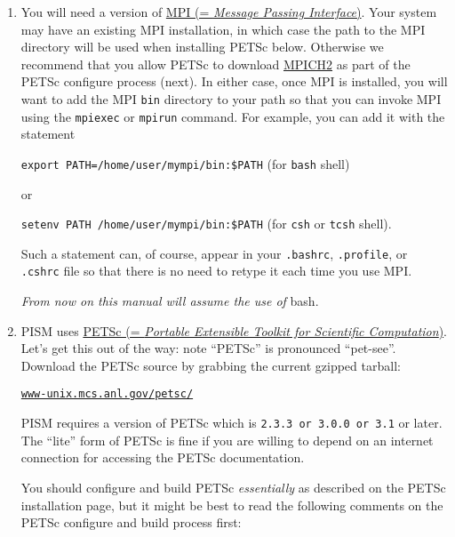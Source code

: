 \documentclass[11pt,final]{amsart}
\newcommand{\PETSCREL}{2.3.3 or 3.0.0 or 3.1}
\renewcommand{\t}[1]{\texttt{#1}}
\begin{document}
\begin{enumerate}
\item You will need a version of \href{http://www-unix.mcs.anl.gov/mpi/}{MPI (= \emph{Message Passing Interface})}. Your system may have an existing MPI installation, in which case the path to the MPI
  directory will be used when installing PETSc below. Otherwise we recommend that you allow PETSc to download
  \href{http://www-unix.mcs.anl.gov/mpi/mpich2/}{MPICH2} as part of the PETSc configure process (next). In either case, once MPI
  is installed, you will want to add the MPI \texttt{bin} directory to your path so that you can invoke MPI using the \texttt{mpiexec}
  or \texttt{mpirun} command. For example, you can add it with the statement

\texttt{export PATH=/home/user/mympi/bin:\$PATH}  \qquad (for \texttt{bash} shell)

\noindent or

\texttt{setenv PATH /home/user/mympi/bin:\$PATH}  \qquad (for \texttt{csh} or \texttt{tcsh} shell).

\noindent Such a statement can, of course, appear in your \texttt{.bashrc}, \texttt{.profile}, or \texttt{.cshrc} file so that there is
no need to retype it each time you use MPI.

\medskip
\begin{center}
  \emph{From now on this manual will assume the use of} bash.
\end{center}
\medskip

\item PISM uses \href{http://www-unix.mcs.anl.gov/petsc/}{PETSc (= \emph{Portable Extensible Toolkit for
 Scientific Computation})}.  Let's get this out of the way: note ``PETSc'' is pronounced ``pet-see''.  Download the PETSc source by grabbing the current gzipped tarball:
\begin{center}
    \href{http://www-unix.mcs.anl.gov/petsc/}{\t{www-unix.mcs.anl.gov/petsc/}}
\end{center}
PISM requires a version of PETSc which is \texttt{\PETSCREL} or later.  The ``lite'' form of PETSc is fine if you are willing to depend on an internet connection for accessing the PETSc documentation.

You should configure and build PETSc \emph{essentially} as described on the PETSc installation page, but it might be best to read the following comments on the PETSc configure and build process first:


\end{enumerate}
\end{document}
